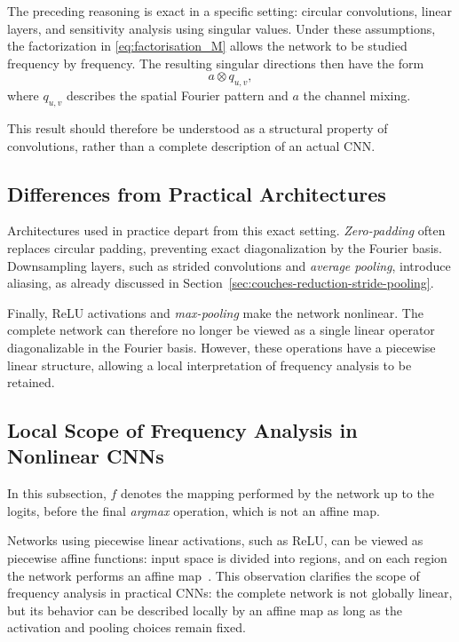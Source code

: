 The preceding reasoning is exact in a specific setting: circular convolutions, linear
layers, and sensitivity analysis using singular values. Under these assumptions, the
factorization in \eqref{eq:factorisation_M} allows the network to be studied frequency by
frequency. The resulting singular directions then have the form
\[
    a \otimes q_{u,v},
\]
where $q_{u,v}$ describes the spatial Fourier pattern and $a$ the channel mixing.

This result should therefore be understood as a structural property of convolutions, rather than
a complete description of an actual CNN.

\subsection{Differences from Practical Architectures}

Architectures used in practice depart from this exact setting. \textit{Zero-padding}
often replaces circular padding, preventing exact diagonalization by the Fourier
basis. Downsampling layers, such as strided convolutions and \textit{average
pooling}, introduce aliasing, as already discussed in
Section~\ref{sec:couches-reduction-stride-pooling}.

Finally, ReLU activations and \textit{max-pooling} make the network nonlinear. The complete
network can therefore no longer be viewed as a single linear operator diagonalizable in the Fourier basis.
However, these operations have a piecewise linear structure, allowing
a local interpretation of frequency analysis to be retained.

\subsection{Local Scope of Frequency Analysis in Nonlinear CNNs}

In this subsection, $f$ denotes the mapping performed by the network
up to the logits, before the final \textit{argmax} operation, which is not an affine map.

Networks using piecewise linear activations, such as ReLU, can be viewed
as piecewise affine functions: input space is divided into regions, and on
each region the network performs an affine map~\cite{montufar2014number,balestriero2018spline}.
This observation clarifies the scope of frequency analysis in practical CNNs:
the complete network is not globally linear, but its behavior can be described
locally by an affine map as long as the activation and pooling choices remain fixed.

